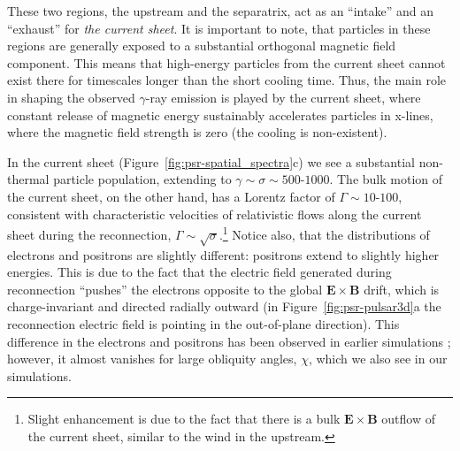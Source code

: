 These two regions, the upstream and the separatrix, act as an ``intake'' and an ``exhaust'' for \emph{the current sheet}. It is important to note, that particles in these regions are generally exposed to a substantial orthogonal magnetic field component. This means that high-energy particles from the current sheet cannot exist there for timescales longer than the short cooling time. Thus, the main role in shaping the observed $\gamma$-ray emission is played by the current sheet, where constant release of magnetic energy sustainably accelerates particles in x-lines, where the magnetic field strength is zero (the cooling is non-existent).

In the current sheet (Figure~\ref{fig:psr-spatial_spectra}c) we see a substantial non-thermal particle population, extending to $\gamma\sim \sigma\sim 500\text{-}1000$. The bulk motion of the current sheet, on the other hand, has a Lorentz factor of $\Gamma\sim 10\text{-}100$, consistent with characteristic velocities of relativistic flows along the current sheet during the reconnection, $\Gamma\sim \sqrt{\sigma}$.\footnote{Slight enhancement is due to the fact that there is a bulk $\bm{E}\times\bm{B}$ outflow of the current sheet, similar to the wind in the upstream.} Notice also, that the distributions of electrons and positrons are slightly different: positrons extend to slightly higher energies. This is due to the fact that the electric field generated during reconnection ``pushes'' the electrons opposite to the global $\bm{E}\times\bm{B}$ drift, which is charge-invariant and directed radially outward (in Figure~\ref{fig:psr-pulsar3d}a the reconnection electric field is pointing in the out-of-plane direction). This difference in the electrons and positrons has been observed in earlier simulations \citep[see, e.g.,][]{PSAS18}; however, it almost vanishes for large obliquity angles, $\chi$, which we also see in our simulations.

